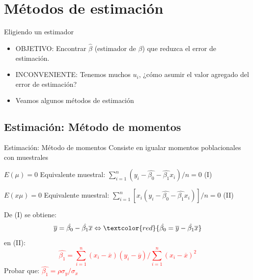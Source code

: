 \section{Métodos de estimación}
\begin{frame}{Eligiendo un estimador}
	\begin{itemize}
		\item OBJETIVO: Encontrar $\widehat{\beta}$ (estimador de $\beta$) que reduzca el error de estimación. \pause
		\item INCONVENIENTE: Tenemos muchos $u_i$, ¿cómo asumir el valor agregado del error de estimación? \pause
		\item Veamos algunos métodos de estimación
	\end{itemize}
\end{frame}

\subsection{Estimación: Método de momentos}
\begin{frame}{Estimación: Método de momentos}
	Consiste en igualar momentos poblacionales con muestrales
	\vspace{2mm}
	\begin{block}{$ E(\mu)=0 $}
		Equivalente muestral: $ \sum_{i=1}^{n}(y_{i}-\hat{\beta_{0}}-\hat{\beta_{1}}x_{i})/n=0 $  (I)
	\end{block}
	\begin{exampleblock}{$ E(x \mu)=0 $}
		Equivalente muestral: $ \sum_{i=1}^{n}[x_{i}(y_{i}-\hat{\beta_{0}}-\hat{\beta_{1}}x_{i})]/n=0 $ (II)
	\end{exampleblock}
	De (I) se obtiene:
	$$\overline{y}=\hat{\beta_{0}}-\hat{\beta_{1}}\overline{x} \Leftrightarrow
	\textcolor{red}{\hat{\beta_{0}}=\overline{y}-\hat{\beta_{1}}\overline{x}}$$
	en (II):
	\textcolor{red}{$$\hat{\beta_{1}}=\sum_{i=1}^{n}(x_{i}-\overline{x})(y_{i}-\overline{y})/\sum_{i=1}^{n}(x_{i}-\overline{x})^{2}$$}
	Probar que: \textcolor{red}{$\hat{\beta_{1}}=\rho \sigma_{y}/\sigma_{x}$}
\end{frame}

